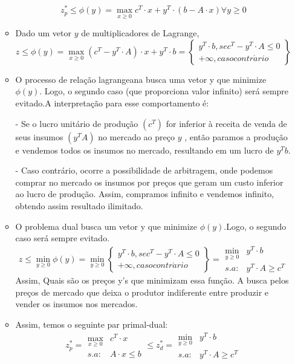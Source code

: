 \begin{enumerate}
\begin{itemize}
\[
z_{p}^{*}\leq\phi(y)=\max_{x\geq0}c^{T}\cdot x+y^{T}\cdot(b-A\cdot x)\forall y\geq0
\]
\item Dado um vetor $y$ de multiplicadores de Lagrange,
\[
z\leq\phi(y)=\max_{x\geq0}(c^{T}-y^{T}\cdot A)\cdot x+y^{T}\cdot b=\left\{ \begin{array}{c}
y^{T}\cdot b,sec^{T}-y^{T}\cdot A\leq0\\
+\infty,casocontr\acute{a}rio
\end{array}\right\} 
\]
\item O processo de relação lagrangeana busca uma vetor y que minimize $\phi(y)$. Logo, o segundo caso (que proporciona valor infinito) será sempre evitado.A interpretação para esse comportamento é:
\item[-] Se o lucro unitário de produção $(c^{T})$ for inferior à receita de venda de seus insumos $(y^{T}A)$ no mercado ao preço $y$ , então paramos a produção e vendemos todos os insumos no mercado, resultando em um lucro de $y^{T}b$.
\item[-] Caso contrário, ocorre a possibilidade de arbitragem, onde podemos comprar no mercado os insumos por preços que geram um custo inferior ao lucro de produção. Assim, compramos infinito e vendemos infinito, obtendo assim resultado ilimitado.
\item O problema dual busca um vetor y que minimize $\phi(y)$.Logo, o segundo caso será sempre evitado.
$$
z\leq\min_{y\geq0}\phi(y)=\min_{y\geq0}\left\{ \begin{array}{c}
y^{T}\cdot b,sec^{T}-y^{T}\cdot A\leq0\\
+\infty,casocontr\acute{a}rio
\end{array}\right\} =\begin{array}{cc}
\min_{y\geq0} & y^{T}\cdot b\\
s.a: & y^{T}\cdot A\geq c^{T}
\end{array}
$$
Assim, Quais são os preços y's que minimizam essa função. A busca pelos preços de mercado que deixa o produtor indiferente entre produzir e vender os insumos nos mercados.
\item Assim, temos o seguinte par primal-dual:
$$
z_{p}^{*}=\begin{array}{cc}
\max_{x\geq0} & c^{T}\cdot x\\
s.a: & A\cdot x\leq b
\end{array}\leq z_{d}^{*}=\begin{array}{cc}
\min_{y\geq0} & y^{T}\cdot b\\
s.a: & y^{T}\cdot A\geq c^{T}
\end{array}
$$
\end{itemize}
\end{enumerate}
